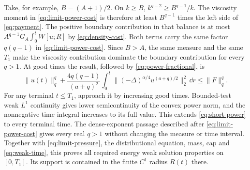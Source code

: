 Take, for example, $B=(A+1)/2$. On $k\geq B$,
$k^{q-2}\geq B^{q-1}/k$. The viscosity moment in
\eqref{eq:limit-power-cost} is therefore at least $B^{q-1}$ times the
left side of \eqref{eq:payment}. The positive boundary contribution in that balance is at most
$A^{q-1}G_A\int_0^tW[u;R]$ by \eqref{eq:density-cost}.
Both terms carry the same factor $q(q-1)$ in \eqref{eq:limit-power-cost}.
Since $B>A$, the same measure and the same $T_1$ make the viscosity
contribution dominate the boundary contribution for every $q>1$.
At good times the result, followed by
\eqref{eq:power-fractional}, is
\begin{equation}\label{eq:short-power}
 \|u(t)\|_q^q+\frac{4q(q-1)}{(a+q)^2}
 \int_0^t\|(-\Delta)^{\alpha/4}u^{(a+q)/2}\|_2^2\,\dd r
 \leq\|F\|_q^q.
\end{equation}
For any terminal $t\leq T_1$, approach it by increasing good times.
Bounded-test weak $L^1$ continuity gives lower semicontinuity of the
convex power norm, and the nonnegative time integral increases to its
full value. This extends \eqref{eq:short-power} to every terminal time.
The dense-exponent passage described after \eqref{eq:limit-power-cost}
gives every real $q>1$ without changing the measure or time interval.
Together with \eqref{eq:limit-pressure}, the distributional equation,
mass, cap and \eqref{eq:weak-time}, this proves all required energy weak
solution properties on $[0,T_1]$. Its support is contained in the finite
$C^1$ radius $R(t)$ there.
